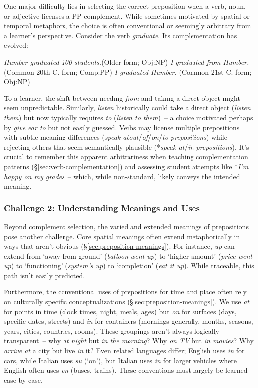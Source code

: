 One major difficulty lies in selecting the correct preposition when a verb, noun, or adjective licenses a PP complement. While sometimes motivated by spatial or temporal metaphors, the choice is often conventional or seemingly arbitrary from a learner's perspective. Consider the verb \textit{graduate}. Its complementation has evolved:

\ea\label{ex:graduate-comps-redux-2}
    \ea \textit{Humber graduated {\ob}100 students\cb.}\hfill(Older form; Obj:NP)
    \ex \textit{I graduated {\ob}from Humber\cb.} \hfill(Common 20th C. form; Comp:PP)
    \ex \textit{I graduated {\ob}Humber\cb.} \hfill(Common 21st C. form; Obj:NP)
    \z
\z

To a learner, the shift between needing \textit{from} and taking a direct object might seem unpredictable. Similarly, \textit{listen} historically could take a direct object (\textit{listen them}) but now typically requires \textit{to} (\textit{listen {\ob}to them\cb})~-- a choice motivated perhaps by \textit{give ear to} but not easily guessed. Verbs may license multiple prepositions with subtle meaning differences (\textit{speak about}/\textit{of}/\textit{on}/\textit{to prepositions}) while rejecting others that seem semantically plausible (*\textit{speak at}/\textit{in prepositions}). It's crucial to remember this apparent arbitrariness when teaching complementation patterns (\S\ref{sec:verb-complementation}) and assessing student attempts like *\textit{I'm happy on my grades}~-- which, while non-standard, likely conveys the intended meaning.

\subsubsection*{Challenge 2: Understanding Meanings and Uses}\label{sec:meaning-use-challenge}

Beyond complement selection, the varied and extended meanings of prepositions pose another challenge. Core spatial meanings often extend metaphorically in ways that aren't obvious (\S\ref{sec:preposition-meanings}). For instance, \textit{up} can extend from `away from ground' (\textit{balloon went up}) to `higher amount' (\textit{price went up}) to `functioning' (\textit{system's up}) to `completion' (\textit{eat it up}). While traceable, this path isn't easily predicted.

Furthermore, the conventional uses of prepositions for time and place often rely on culturally specific conceptualizations (\S\ref{sec:preposition-meanings}). We use \textit{at} for points in time (clock times, night, meals, ages) but \textit{on} for surfaces (days, specific dates, streets) and \textit{in} for containers (mornings generally, months, seasons, years, cities, countries, rooms). These groupings aren't always logically transparent~-- why \textit{at night} but \textit{in the morning}? Why \textit{on TV} but \textit{in movies}? Why \textit{arrive at} a city but live \textit{in} it? Even related languages differ; English uses \textit{in} for cars, while Italian uses \textit{su} (`on'), but Italian uses \textit{in} for larger vehicles where English often uses \textit{on} (buses, trains). These conventions must largely be learned case-by-case.

